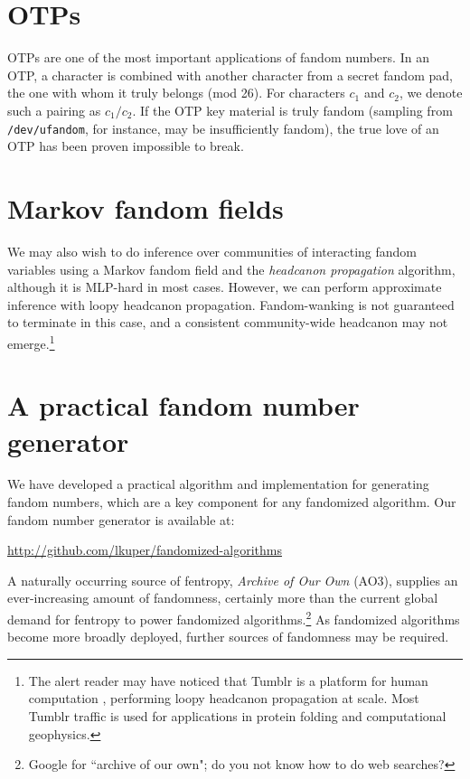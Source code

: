 \documentclass[9pt]{sigplanconf}
\begin{document}
\section{OTPs}
OTPs are one of the most important applications of fandom numbers.  In
an OTP, a character is combined with another character from a secret
fandom pad, the one with whom it truly belongs (mod 26).  For
characters $c_1$ and $c_2$, we denote such a pairing as $c_1/c_2$.  If
the OTP key material is truly fandom (sampling from {\tt
  /dev/ufandom}, for instance, may be insufficiently fandom), the true
love of an OTP has been proven impossible to break.

\section{Markov fandom fields}
We may also wish to do inference over communities of interacting fandom
variables using a Markov fandom field and the \emph{headcanon propagation}
algorithm, although it is MLP-hard in most cases.  However, we can perform
approximate inference with loopy headcanon propagation.  Fandom-wanking is not
guaranteed to terminate in this case, and a consistent community-wide headcanon
may not emerge.\footnote{The alert reader may have noticed that Tumblr is a
platform for human computation \cite{luisvonahn}, performing loopy headcanon
propagation at scale. Most Tumblr traffic is used for applications in protein
folding and computational geophysics.}

\section{A practical fandom number generator}
We have developed a practical algorithm and implementation for
generating fandom numbers, which are a key component for any
fandomized algorithm. Our fandom number generator is available at:
\begin{center}
\url{http://github.com/lkuper/fandomized-algorithms}
\end{center}
\noindent A naturally occurring source of fentropy, \textit{Archive of
  Our Own} (AO3), supplies an ever-increasing amount of
fandomness, certainly more than the current global demand for fentropy
to power fandomized algorithms.\footnote{Google for ``archive of our own"; do you
  not know how to do web searches?\footnotemark} As fandomized algorithms become more
broadly deployed, further sources of fandomness may be required.
\end{document}
